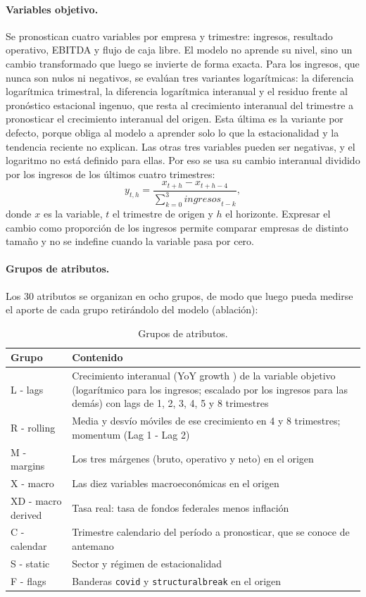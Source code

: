 \documentclass[12pt,letterpaper,oneside]{report}
\renewcommand{\_}{\UnderscoreOriginal\allowbreak}
\begin{document}
\paragraph{Variables objetivo.} Se pronostican cuatro variables por empresa y trimestre: ingresos, resultado operativo, EBITDA y flujo de caja libre. El modelo no aprende su nivel, sino un cambio transformado que luego se invierte de forma exacta. Para los ingresos, que nunca son nulos ni negativos, se evalúan tres variantes logarítmicas: la diferencia logarítmica trimestral, la diferencia logarítmica interanual y el residuo frente al pronóstico estacional ingenuo, que resta al crecimiento interanual del trimestre a pronosticar el crecimiento interanual del origen. Esta última es la variante por defecto, porque obliga al modelo a aprender solo lo que la estacionalidad y la tendencia reciente no explican. Las otras tres variables pueden ser negativas, y el logaritmo no está definido para ellas. Por eso se usa su cambio interanual dividido por los ingresos de los últimos cuatro trimestres:
\[
y_{t,h} = \frac{x_{t+h} - x_{t+h-4}}{\sum_{k=0}^{3} \mathit{ingresos}_{t-k}},
\]
donde $x$ es la variable, $t$ el trimestre de origen y $h$ el horizonte. Expresar el cambio como proporción de los ingresos permite comparar empresas de distinto tamaño y no se indefine cuando la variable pasa por cero.

\paragraph{Grupos de atributos.} Los 30 atributos se organizan en ocho grupos, de modo que luego pueda medirse el aporte de cada grupo retirándolo del modelo (ablación):

\begin{table}[H]
\centering
\caption{Grupos de atributos.}
\label{tab:grupos-fe}
\begin{tabular}{@{}l>{\raggedright\arraybackslash}p{11.5cm}@{}}
\toprule
Grupo & Contenido \\
\midrule
L - lags  & Crecimiento interanual (YoY growth ) de la variable objetivo (logarítmico para los ingresos; escalado por los ingresos para las demás) con lags de 1, 2, 3, 4, 5 y 8 trimestres \\
R - rolling & Media y desvío móviles de ese crecimiento en 4 y 8 trimestres; momentum  (Lag 1 -  Lag 2) \\
M - margins & Los tres márgenes (bruto, operativo y neto) en el origen \\
X - macro & Las diez variables macroeconómicas en el origen \\
XD - macro derived & Tasa real: tasa de fondos federales menos inflación \\
C - calendar & Trimestre calendario del período a pronosticar, que se conoce de antemano \\
S - static & Sector y régimen de estacionalidad \\
F - flags & Banderas \texttt{covid} y \texttt{structural\_break} en el origen \\
\bottomrule
\end{tabular}
\end{table}
\end{document}
